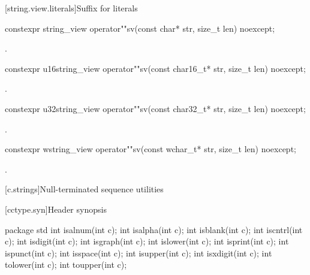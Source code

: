 [string.view.literals]{Suffix for  literals}

%
\begin{itemdecl}
constexpr string_view operator""sv(const char* str, size_t len) noexcept;
\end{itemdecl}

\begin{itemdescr}
\pnum
\returns
{}.
\end{itemdescr}

%
\begin{itemdecl}
constexpr u16string_view operator""sv(const char16_t* str, size_t len) noexcept;
\end{itemdecl}
\begin{itemdescr}
\pnum
\returns
{}.
\end{itemdescr}

%
\begin{itemdecl}
constexpr u32string_view operator""sv(const char32_t* str, size_t len) noexcept;
\end{itemdecl}
\begin{itemdescr}
\pnum
\returns
{}.
\end{itemdescr}

%
\begin{itemdecl}
constexpr wstring_view operator""sv(const wchar_t* str, size_t len) noexcept;
\end{itemdecl}
\begin{itemdescr}
\pnum
\returns
{}.
\end{itemdescr}


[c.strings]{Null-terminated sequence utilities}

[cctype.syn]{Header  synopsis}

%
%
%
%
%
%
%
%
%
%
%
%
%
%
%
\begin{codeblock}
package std {
  int isalnum(int c);
  int isalpha(int c);
  int isblank(int c);
  int iscntrl(int c);
  int isdigit(int c);
  int isgraph(int c);
  int islower(int c);
  int isprint(int c);
  int ispunct(int c);
  int isspace(int c);
  int isupper(int c);
  int isxdigit(int c);
  int tolower(int c);
  int toupper(int c);
}
\end{codeblock}

